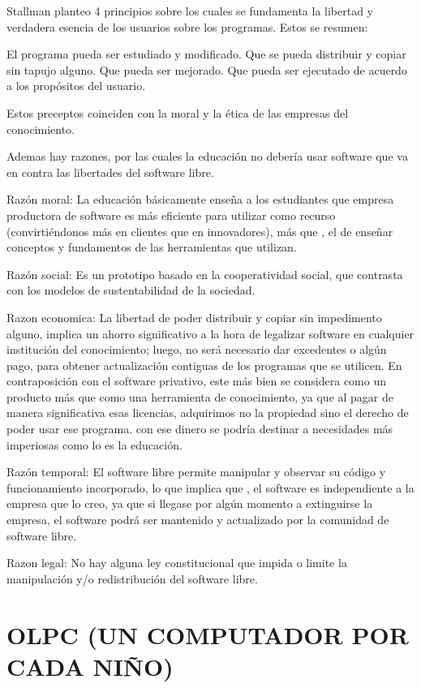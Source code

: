Stallman planteo 4 principios sobre los cuales se fundamenta la
libertad y verdadera esencia de los usuarios sobre los
programas. Estos se resumen:

El programa pueda ser estudiado y modificado. Que se pueda
distribuir y copiar sin tapujo alguno. Que pueda ser mejorado.
Que pueda ser ejecutado de acuerdo a los propósitos del
usuario.

Estos preceptos coinciden con la moral y la ética de las
empresas del conocimiento.

Ademas hay razones, por las cuales la educación no debería usar
software que va en contra las libertades del software libre.

Razón moral: La educación básicamente enseña a los
estudiantes que empresa productora de software es más
eficiente para utilizar como recurso (convirtiéndonos más en
clientes que en innovadores), más que , el de enseñar conceptos
y fundamentos de las herramientas que utilizan.

Razón social: Es un prototipo basado en la cooperatividad social,
que contrasta con los modelos de sustentabilidad de la sociedad.

Razon economica: La libertad de poder distribuir y copiar sin
impedimento alguno, implica un ahorro significativo a la hora de
legalizar software en cualquier institución del conocimiento;
luego, no será necesario dar excedentes o algún pago, para
obtener actualización contiguas de los programas que se
utilicen. En contraposición con el software privativo, este más
bien se considera como un producto más que como una
herramienta de conocimiento, ya que al pagar de manera
significativa esas licencias, adquirimos no la propiedad sino el
derecho de poder usar ese programa. con ese dinero se podría
destinar a necesidades más imperiosas como lo es la educación.

Razón temporal: El software libre permite manipular y observar
su código y funcionamiento incorporado, lo que implica que , el
software es independiente a la empresa que lo creo, ya que si
llegase por algún momento a extinguirse la empresa, el software
podrá ser mantenido y actualizado por la comunidad de software
libre.

Razon legal: No hay alguna ley constitucional que impida o
limite la manipulación y/o redistribución del software libre.

\section*{OLPC (UN COMPUTADOR POR CADA NIÑO)}

